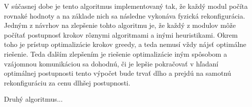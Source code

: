 \documentclass[
  digital, %
  oneside, %
  table,   %
  lof,     %
  nolot,     %
]{fithesis3}
\begin{document}
V súčasnej dobe je tento algoritmus implementovaný tak, že každý modul počíta rovnaké hodnoty a na základe nich sa následne vykonáva fyzická rekonfigurácia. Jedným z návrhov na zlepšenie tohto algoritmu je, že každý z modulov môže počítať postupnosť krokov rôznymi algoritmami a inými heuristikami. Okrem toho je prístup optimalizácie krokov greedy, a teda nemusí vždy nájsť optimálne riešenie. Teda ďalším zlepšením je riešenie optimalizácie iným spôsobom a vzájomnou komunikáciou sa dohodnú, či je lepšie pokračovať v hľadaní optimálnej postupnosti tento výpočet bude trvať dlho a prejdú na samotnú rekonfiguráciu za cenu dlhšej postupnosti. 

Druhý algoritmus...


\printbibliography[heading=bibintoc] %
\end{document}
